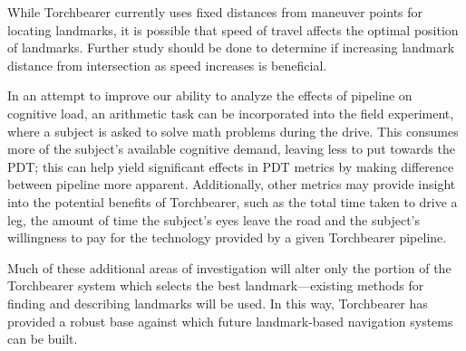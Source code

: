 While Torchbearer currently uses fixed distances from maneuver points for locating landmarks, it is possible that speed of travel affects the optimal position of landmarks. Further study should be done to determine if increasing landmark distance from intersection as speed increases is beneficial.

In an attempt to improve our ability to analyze the effects of pipeline on cognitive load, an arithmetic task can be incorporated into the field experiment, where a subject is asked to solve math problems during the drive. This consumes more of the subject's available cognitive demand, leaving less to put towards the PDT; this can help yield significant effects in PDT metrics by making difference between pipeline more apparent. Additionally, other metrics may provide insight into the potential benefits of Torchbearer, such as the total time taken to drive a leg, the amount of time the subject's eyes leave the road and the subject's willingness to pay for the technology provided by a given Torchbearer pipeline.

Much of these additional areas of investigation will alter only the portion of the Torchbearer system which selects the best landmark---existing methods for finding and describing landmarks will be used. In this way, Torchbearer has provided a robust base against which future landmark-based navigation systems can be built.